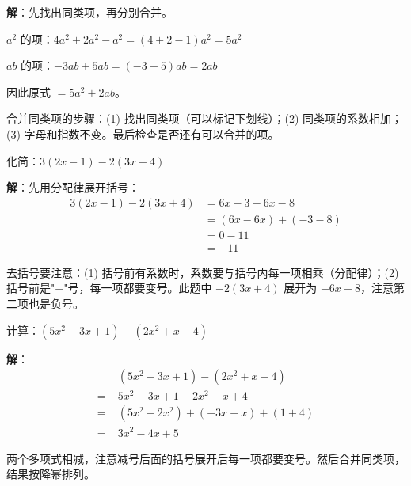 \documentclass[12pt, a4paper]{ctexart}
\begin{document}
\textbf{解}：先找出同类项，再分别合并。

$a^2$ 的项：$4a^2 + 2a^2 - a^2 = (4+2-1)a^2 = 5a^2$

$ab$ 的项：$-3ab + 5ab = (-3+5)ab = 2ab$

因此原式 $= 5a^2 + 2ab$。

\begin{tipbox}[方法总结]
合并同类项的步骤：(1) 找出同类项（可以标记下划线）；(2) 同类项的系数相加；(3) 字母和指数不变。最后检查是否还有可以合并的项。
\end{tipbox}

\vspace{6pt}

\begin{examplebox}[【例题4】去括号化简]
化简：$3(2x - 1) - 2(3x + 4)$
\end{examplebox}

\textbf{解}：先用分配律展开括号：
\begin{align*}
3(2x - 1) - 2(3x + 4) &= 6x - 3 - 6x - 8 \\
&= (6x - 6x) + (-3 - 8) \\
&= 0 - 11 \\
&= -11
\end{align*}

\begin{tipbox}[方法总结]
去括号要注意：(1) 括号前有系数时，系数要与括号内每一项相乘（分配律）；(2) 括号前是"$-$"号，每一项都要变号。此题中 $-2(3x+4)$ 展开为 $-6x - 8$，注意第二项也是负号。
\end{tipbox}

\vspace{6pt}

\begin{examplebox}[【例题5】整式的加减运算]
计算：$(5x^2 - 3x + 1) - (2x^2 + x - 4)$
\end{examplebox}

\textbf{解}：
\begin{align*}
&(5x^2 - 3x + 1) - (2x^2 + x - 4) \\
=\;& 5x^2 - 3x + 1 - 2x^2 - x + 4 \\
=\;& (5x^2 - 2x^2) + (-3x - x) + (1 + 4) \\
=\;& 3x^2 - 4x + 5
\end{align*}

\begin{tipbox}[方法总结]
两个多项式相减，注意减号后面的括号展开后每一项都要变号。然后合并同类项，结果按降幂排列。
\end{tipbox}
\end{document}
